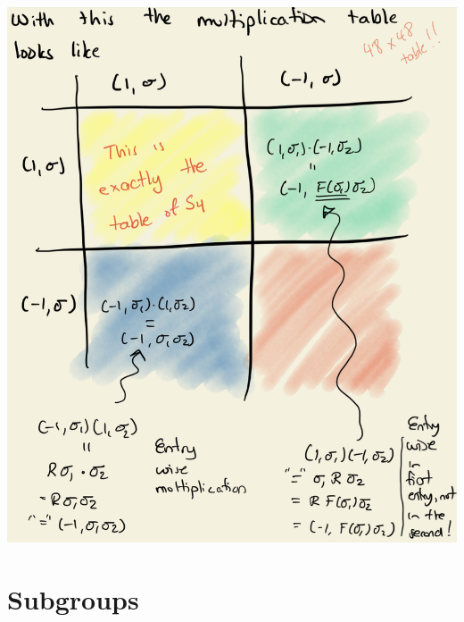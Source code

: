 \begin{center}
    \includegraphics[width=0.67\linewidth]{figures/rotation_s4_table.png}
\end{center}


\section{Subgroups}

